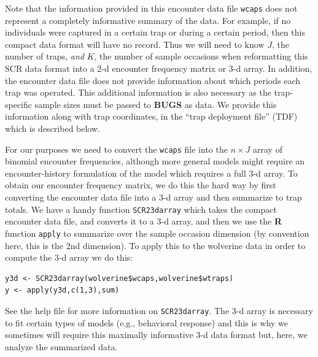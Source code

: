 Note that the information provided in this encounter data file
\mbox{\tt wcaps} does not represent a completely informative summary
of the data. For example, if no individuals were captured in a certain
trap or during a certain period, then this compact data format will
have no record. Thus we will need to know $J$, the number of traps,
{\it and} $K$, the number of sample occasions
when reformatting this SCR data format into a 2-d
encounter frequency matrix or 3-d array. In addition, the encounter
data file does not provide information about which periods each trap
was operated. This additional information is also necessary as the
trap-specific sample sizes must be passed to {\bf BUGS} as data. We
provide this information along with trap
coordinates, in the ``trap deployment file'' (TDF)
 which is described below.

For our purposes we need to convert the \mbox{\tt wcaps} file into the
 $n \times J$ array of
binomial encounter frequencies, although more general models might
require an encounter-history formulation of the model which requires a
full 3-d array.  To obtain our encounter frequency matrix, we do this
the hard way by first converting the encounter data file into a 3-d
array and then summarize to trap totals. We have a handy function
\mbox{\tt SCR23darray} which takes the compact encounter data file,
and
converts it to a 3-d array, and then we use the {\bf R} function
\mbox{\tt apply} to summarize over the sample occasion dimension (by
convention here, this is the 2nd dimension). To apply this to the
wolverine data in order to compute the 3-d array we do this:
{\small
\begin{verbatim}
y3d <- SCR23darray(wolverine$wcaps,wolverine$wtraps)
y <- apply(y3d,c(1,3),sum)
\end{verbatim}
}
See the help file for more information on \mbox{\tt SCR23darray}.
The 3-d array is necessary to fit certain types of models (e.g.,
behavioral response) and this is why we sometimes will require this
maximally informative 3-d data format but, here, we analyze the
summarized data.



